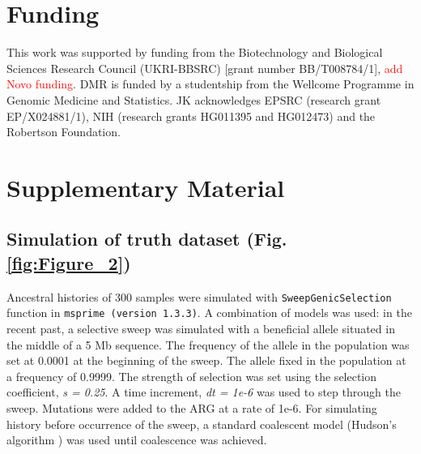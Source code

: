 \documentclass[unnumsec,webpdf,contemporary,large,namedate]{oup-authoring-template}%
\begin{document}

\section*{Funding}
This work was supported by funding from the Biotechnology and Biological
Sciences Research Council (UKRI-BBSRC) [grant number BB/T008784/1],
\textcolor{red}{add Novo funding}. DMR is funded by 
a studentship from the Wellcome Programme in Genomic Medicine and Statistics.
JK acknowledges EPSRC (research grant EP/X024881/1),
NIH (research grants HG011395 and HG012473)
and the Robertson Foundation.




\clearpage \onecolumn \setcounter{figure}{0}
\renewcommand{\thefigure}{S\arabic{figure}}

\section{Supplementary Material}
\subsection{Simulation of truth dataset (Fig. \ref{fig:Figure_2})}
\label{subsec:sweep_simulation}
Ancestral
histories of 300 samples were simulated with \texttt{SweepGenicSelection}
function in \texttt{msprime (version 1.3.3)}. A combination of models was used:
in the recent past, a selective sweep was simulated with a beneficial allele
situated in the middle of a 5 Mb sequence. The frequency of the allele in the
population was set at 0.0001 at the beginning of the sweep. The allele fixed in
the population at a frequency of 0.9999. The strength of selection was set
using the selection coefficient, \textit{s = 0.25}. A time increment,
\textit{dt = 1e-6} was used to step through the sweep. Mutations were added to
the ARG at a rate of 1e-6. For simulating history before occurrence of the
sweep, a standard coalescent model (Hudson's algorithm \citep{Hudson1983}) was
used until coalescence was achieved.
\end{document}
